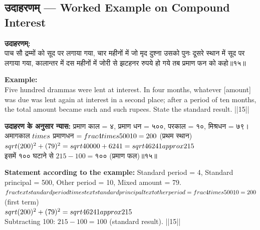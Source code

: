 \documentclass[10pt,a4paper]{article}
\newcommand{\dev}[1]{{\devanagarifont #1}}
\newcommand{\bilingual}[2]{%
  \noindent%
  \begin{minipage}[t]{0.47\textwidth}%
    \setstretch{1.15}#1%
  \end{minipage}%
  \hfill%
  \vrule\hfill%
  \begin{minipage}[t]{0.47\textwidth}%
    \setstretch{1.15}#2%
  \end{minipage}%
  \par\medskip
}
\begin{document}
\subsection{\dev{उदाहरणम्} --- Worked Example on Compound Interest}

\bilingual{%
\textbf{उदाहरणम्:}\\[0.3em]
पाच सौ द्रम्मों को सूद पर लगाया गया, चार महीनों में जो मृद दुश्ना उसको पुनः दूसरे स्थान में सूद पर लगाया गया, कालान्तर में दस महीनों में जोरी से झटहनर रुपये हो गये तब प्रमाण फन को कहो॥१५॥
}{%
\textbf{Example:}\\[0.3em]
Five hundred drammas were lent at interest. In four months, whatever [amount] was due was lent again at interest in a second place; after a period of ten months, the total amount became such and such rupees. State the standard result. ||15||
}

\bilingual{%
\textbf{उदाहरण के अनुसार न्यास:} प्रमाण काल = ४, प्रमाण धन = ५००, परकाल = १०, मिश्रधन = ७९।\\[0.3em]
अमागकाल $\\times$ प्रमाणधन $= \\frac{4 \\times 500}{10} = 200$ (प्रथम स्थान)\\[0.3em]
$\\sqrt{(200)^2 + (79)^2} = \\sqrt{40000 + 6241} = \\sqrt{46241} \\approx 215$\\[0.3em]
इसमें १०० घटाने से $215 - 100 = १००$ (प्रमाण फल)॥१५॥
}{%
\textbf{Statement according to the example:} Standard period = 4, Standard principal = 500, Other period = 10, Mixed amount = 79.\\[0.3em]
$\\frac{\\text{standard period} \\times \\text{standard principal}}{\\text{other period}} = \\frac{4 \\times 500}{10} = 200$ (first term)\\[0.3em]
$\\sqrt{(200)^2 + (79)^2} = \\sqrt{46241} \\approx 215$\\[0.3em]
Subtracting 100: $215 - 100 = 100$ (standard result). ||15||
}
\end{document}
